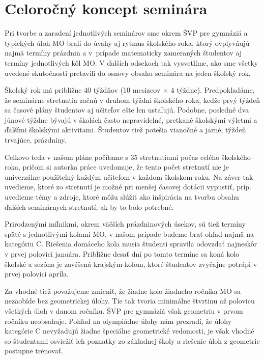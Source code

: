 \documentclass[11pt,a4paper,oneside,final]{book}
\begin{document}
\section{Celoročný koncept seminára}

Pri tvorbe a zaradení jednotlivých seminárov sme okrem ŠVP pre gymnáziá a typických úloh MO brali do úvahy aj rytmus školského roka, ktorý ovplyvňujú najmä termíny prázdnin a v~prípade matematicky zameraných študentov aj termíny jednotlivých kôl MO. V ďalších odsekoch tak vysvetlíme, ako sme všetky uvedené skutočnosti pretavili do osnovy obsahu seminára na jeden školský rok.

Školský rok má približne 40 týždňov (10 mesiacov $\times$ 4 týždne). Predpokladáme, že seminárne stretnutia začnú v druhom týždni školského roka, keďže prvý týždeň sa časové plány študentov aj učiteľov ešte len ustaľujú. Podobne, posledné dva júnové týždne bývajú v školách často nepravidelné, pretkané školskými výletmi a ďalšími školskými aktivitami. Študentov tiež potešia vianočné a jarné, týždeň trvajúce, prázdniny.

Celkovo teda v našom pláne počítame s 35 stretnutiami počas celého školského roka, pričom si autorka práce uvedomuje, že tento počet stretnutí nie je univerzálne použiteľný každým učiteľom v každom školskom roku. Na záver tak uvedieme, ktoré zo stretnutí je možné pri menšej časovej dotácii vypustiť, príp. uvedieme témy a zdroje, ktoré môžu slúžiť ako inšpirácia na tvorbu obsahu ďalších seminárnych stretnutí, ak by to bolo potrebné.

Prirodzenými míľnikmi, okrem väčších prázdninových úsekov, sú tiež termíny späté s jednotlivými kolami MO, v našom prípade budeme brať ohľad najmä na kategóriu C. Riešenia domáceho kola musia študenti spravila odovzdať najneskôr v prvej polovici januára. Približne desať dní po tomto termíne sa koná kolo školské a sezóna je zavŕšená krajským kolom, ktoré študentov zvyčajne potrápi v prvej polovici apríla.

Za vhodné tiež považujeme zmieniť, že žiadne kolo žiadneho ročníka MO sa nezaobíde bez geometrickej úlohy. Tie tak tvoria minimálne štvrtinu až polovicu všetkých úloh v danom ročníku. ŠVP pre gymnáziá však geometriu v prvom ročníku neobsahuje. Pohľad na olympiádne úlohy nám prezradí, že úlohy kategórie C nevyžadujú žiadne špeciálne geometrické vedomosti, je však vhodné so študentami osviežiť ich poznatky zo základnej školy a riešenie úloh z geometrie postupne trénovať.
\end{document}
